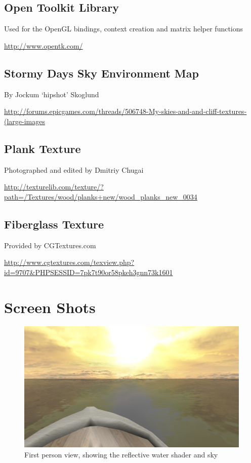 \documentclass[a4paper,11pt]{article}
\begin{document}
\subsection{Open Toolkit Library}
Used for the OpenGL bindings, context creation and matrix helper functions

\url{http://www.opentk.com/}

\subsection{Stormy Days Sky Environment Map}
By Jockum `hipshot' Skoglund

\url{http://forums.epicgames.com/threads/506748-My-skies-and-and-cliff-textures-(large-images}

\subsection{Plank Texture}
Photographed and edited by Dmitriy Chugai

\url{http://texturelib.com/texture/?path=/Textures/wood/planks+new/wood_planks_new_0034}

\subsection{Fiberglass Texture}
Provided by CGTextures.com

\url{http://www.cgtextures.com/texview.php?id=9707&PHPSESSID=7pk7t90or58pkeh3gnn73k1601}

\newpage
\section{Screen Shots}
\begin{figure}[h!]
\centering
\includegraphics[width=\textwidth]{screen1.png}
\caption{First person view, showing the reflective water shader and sky}
\end{figure}
\end{document}
